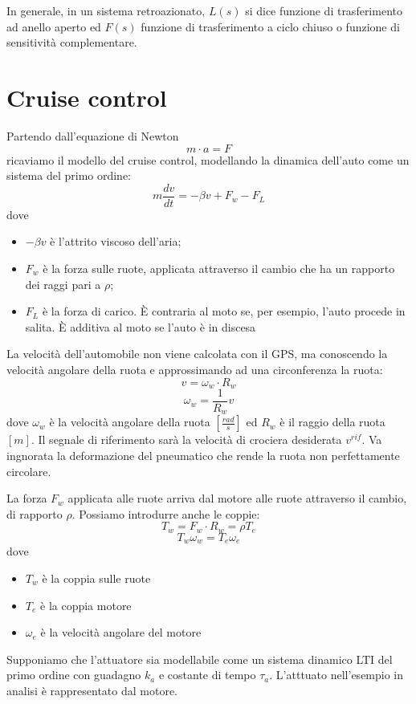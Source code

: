 \documentclass[a4paper]{report}
\begin{document}
In generale, in un sistema retroazionato, $L(s)$ si dice
funzione di trasferimento ad anello aperto ed $F(s)$ funzione di
trasferimento a ciclo chiuso o funzione di sensitivit\`a
complementare.
\section{Cruise control}
Partendo dall'equazione di Newton
\[
m \cdot a = F
\]
ricaviamo il modello del cruise control, modellando la dinamica
dell'auto come un sistema del primo ordine:
\begin{equation}\label{eq:cruise01}
  m \dfrac{dv}{dt} = - \beta v + F_w - F_L
\end{equation}
dove
\begin{itemize}
\item $- \beta v$ \`e l'attrito viscoso dell'aria;
\item $F_w$ \`e la forza sulle ruote, applicata attraverso il cambio
  che ha un rapporto dei raggi pari a $\rho$;
\item $F_L$ \`e la forza di carico. \`E contraria al moto se, per
  esempio, l'auto procede in salita. \`E additiva al moto se l'auto
  \`e in discesa
\end{itemize}
La velocit\`a dell'automobile non viene calcolata con il GPS, ma
conoscendo la velocit\`a angolare della ruota e approssimando ad una
circonferenza la ruota:
\[
v = \omega_w \cdot R_w
\]
\[
\omega_w = \dfrac{1}{R_w} v
\]
dove $\omega_w$ \`e la velocit\`a angolare della ruota $\left[
  \frac{rad}{s}\right]$ ed $R_w$ \`e il raggio della ruota $[m]$. Il
segnale di riferimento sar\`a la velocit\`a di crociera desiderata
$v^{rif}$. Va ingnorata la deformazione del pneumatico che rende la
ruota non perfettamente circolare.

La forza $F_w$ applicata alle ruote arriva dal motore alle ruote
attraverso il cambio, di rapporto $\rho$. Possiamo introdurre anche le
coppie:
\[
T_w = F_w \cdot R_w = \rho T_e
\]
\[
T_w \omega_w = T_e \omega_e
\]
dove
\begin{itemize}
\item $T_w$ \`e la coppia sulle ruote
\item $T_e$ \`e la coppia motore
\item $\omega_e$ \`e la velocit\`a angolare del motore
\end{itemize}

Supponiamo che l'attuatore sia modellabile come un sistema dinamico
LTI del primo ordine con guadagno $k_a$ e costante di tempo
$\tau_a$. L'atttuato nell'esempio in analisi \`e rappresentato dal
motore. 
\end{document}
